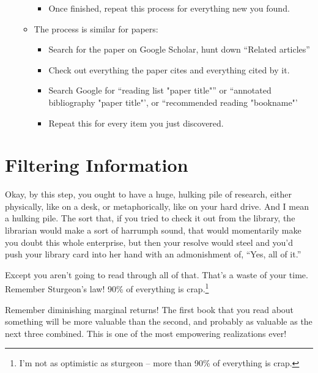 \begin{enumerate}
\begin{itemize}
\begin{itemize}
    \item Once finished, repeat this process for everything new you found.
    \end{itemize}
  \item The process is similar for papers:
    \begin{itemize}
    \item Search for the paper on Google Scholar, hunt down ``Related articles''
    \item Check out everything the paper cites and everything cited by it.
    \item Search Google for ``reading list "paper title"'' or ``annotated bibliography "paper title"', or ``recommended reading "bookname"'
    \item Repeat this for every item you just discovered.
    \end{itemize}
  \end{itemize}
\end{enumerate}

\section{Filtering Information}

Okay, by this step, you ought to have a huge, hulking pile of research, either
physically, like on a desk, or metaphorically, like on your hard drive. And I
mean a hulking pile. The sort that, if you tried to check it out from the
library, the librarian would make a sort of harrumph sound, that would
momentarily make you doubt this whole enterprise, but then your resolve would
steel and you'd push your library card into her hand with an admonishment of,
``Yes, all of it.''

Except you aren't going to read through all of that. That's a waste of
your time. Remember Sturgeon's law! 90\% of everything is
crap.\footnote{I'm not as optimistic as sturgeon -- more than 90\% of
  everything is crap.}

Remember diminishing marginal returns! The first book that you read about something will
be more valuable than the second, and probably as valuable as the next three
combined. This is one of the most empowering realizations ever!


